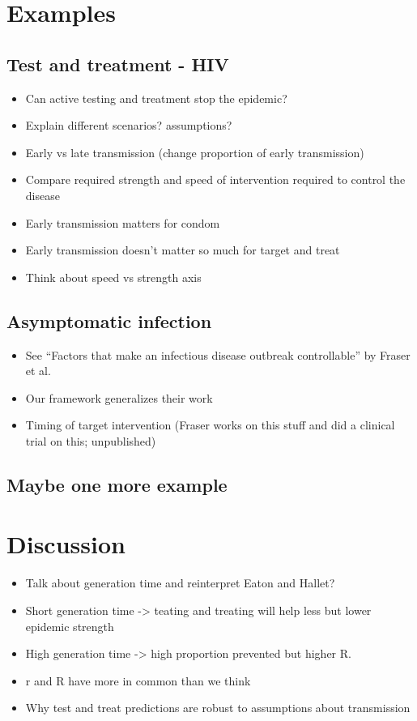 \documentclass{article}\usepackage[]{graphicx}\usepackage[]{color}
\begin{document}
\section{Examples}

\subsection{Test and treatment - HIV}

\begin{itemize}
	\item Can active testing and treatment stop the epidemic?
	\item Explain different scenarios? assumptions?
	\item Early vs late transmission (change proportion of early transmission)
	\item Compare required strength and speed of intervention required to control the disease
	\item Early transmission matters for condom
	\item Early transmission doesn't matter so much for target and treat
	\item Think about speed vs strength axis
\end{itemize}

\subsection{Asymptomatic infection}

\begin{itemize}
	\item See ``Factors that make an infectious disease outbreak controllable'' by Fraser et al.
	\item Our framework generalizes their work
	\item Timing of target intervention (Fraser works on this stuff and did a clinical trial on this; unpublished)
\end{itemize}

\subsection{Maybe one more example}

\section{Discussion}


\begin{itemize}
	\item Talk about generation time and reinterpret Eaton and Hallet?
	\item Short generation time -> teating and treating will help less but lower epidemic strength
	\item High generation time -> high proportion prevented but higher R.
\end{itemize}

\begin{itemize}
	\item r and R have more in common than we think
	\item Why test and treat predictions are robust to assumptions about transmission
\end{itemize}
\end{document}

